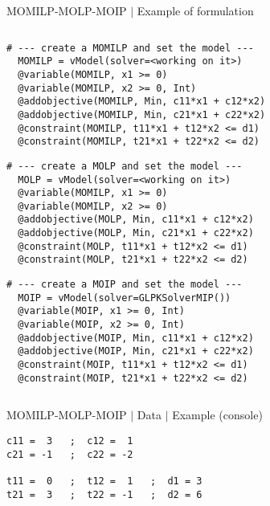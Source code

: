 \documentclass[10pt,xcolor=dvipsnames]{beamer}
\begin{document}
\begin{frame}[fragile=singleslide]{MOMILP-MOLP-MOIP $\mid$ Example of formulation}
{\begin{columns}
\begin{column}{0.66\textwidth}
{\scriptsize
\begin{verbatim}
# --- create a MOMILP and set the model ---
  MOMILP = vModel(solver=<working on it>) 
  @variable(MOMILP, x1 >= 0)
  @variable(MOMILP, x2 >= 0, Int)
  @addobjective(MOMILP, Min, c11*x1 + c12*x2)
  @addobjective(MOMILP, Min, c21*x1 + c22*x2)  
  @constraint(MOMILP, t11*x1 + t12*x2 <= d1)
  @constraint(MOMILP, t21*x1 + t22*x2 <= d2)
\end{verbatim}  
}
{\scriptsize
\begin{verbatim}
# --- create a MOLP and set the model ---
  MOLP = vModel(solver=<working on it>) 
  @variable(MOMILP, x1 >= 0)
  @variable(MOMILP, x2 >= 0)
  @addobjective(MOLP, Min, c11*x1 + c12*x2)
  @addobjective(MOLP, Min, c21*x1 + c22*x2)  
  @constraint(MOLP, t11*x1 + t12*x2 <= d1)
  @constraint(MOLP, t21*x1 + t22*x2 <= d2)
\end{verbatim}  
}
{\scriptsize
\begin{verbatim}
# --- create a MOIP and set the model ---
  MOIP = vModel(solver=GLPKSolverMIP()) 
  @variable(MOIP, x1 >= 0, Int)
  @variable(MOIP, x2 >= 0, Int)
  @addobjective(MOIP, Min, c11*x1 + c12*x2)
  @addobjective(MOIP, Min, c21*x1 + c22*x2)  
  @constraint(MOIP, t11*x1 + t12*x2 <= d1)
  @constraint(MOIP, t21*x1 + t22*x2 <= d2)
\end{verbatim}  
}

\end{column}
\end{columns}
}

\end{frame}

%
% 
\begin{frame}[fragile=singleslide]{MOMILP-MOLP-MOIP  $\mid$ Data $\mid$ Example (console)}

{\small
\begin{verbatim}
c11 =  3   ;  c12 =  1
c21 = -1   ;  c22 = -2

t11 =  0   ;  t12 =  1   ;  d1 = 3
t21 =  3   ;  t22 = -1   ;  d2 = 6
\end{verbatim}
}

\end{frame}
\end{document}
